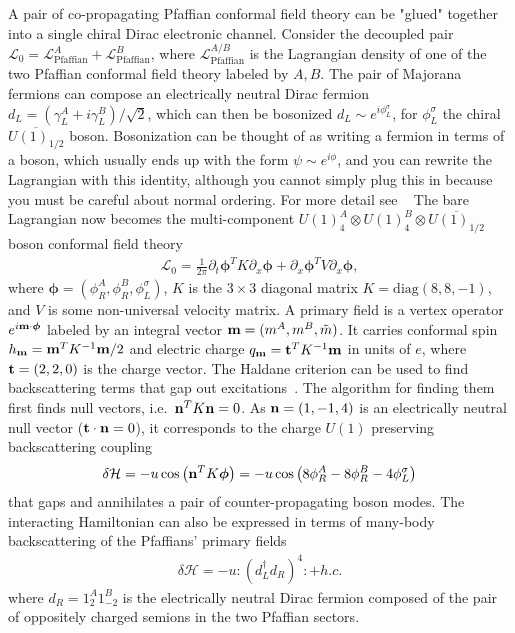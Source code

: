 A pair of co-propagating Pfaffian conformal field theory can be "glued" together into a single chiral Dirac electronic channel. Consider the decoupled pair $\mathcal{L}_0=\mathcal{L}_{\mathrm{Pfaffian}}^A+\mathcal{L}_{\mathrm{Pfaffian}}^B$, where $\mathcal{L}_{\mathrm{Pfaffian}}^{A/B}$ is the Lagrangian density of one of the two Pfaffian conformal field theory labeled by $A,B$. The pair of Majorana fermions can compose an electrically neutral Dirac fermion $d_L=(\gamma^A_L+i\gamma^B_L)/\sqrt{2}$, which can then be bosonized $d_L\sim e^{i\phi^\sigma_L}$, for $\phi^\sigma_L$ the chiral $\overline{U(1)_{1/2}}$ boson. Bosonization can be thought of as writing a fermion in terms of a boson, which usually ends up with the form $\psi\sim e^{i\phi}$, and you can rewrite the Lagrangian with this identity, although you cannot simply plug this in because you must be careful about normal ordering. For more detail see ~\cite{Senechal99} The bare Lagrangian now becomes the multi-component $U(1)_4^A\otimes U(1)_4^B\otimes\overline{U(1)_{1/2}}$ boson conformal field theory \begin{align}\mathcal{L}_0=\frac{1}{2\pi}\partial_t\boldsymbol{\phi}^TK\partial_x\boldsymbol{\phi}+\partial_x\boldsymbol{\phi}^TV\partial_x\boldsymbol{\phi},\label{881}\end{align} where $\boldsymbol{\phi}=(\phi_R^A,\phi_R^B,\phi^\sigma_L)$, $K$ is the $3\times3$ diagonal matrix $K=\mathrm{diag}(8,8,-1)$, and $V$ is some non-universal velocity matrix. A primary field is a vertex operator $e^{i{\bf m}\cdot\boldsymbol{\phi}}$ labeled by an integral vector ${\bf m}=(m^A,m^B,\tilde{m})$. It carries conformal spin $h_{\bf m}={\bf m}^TK^{-1}{\bf m}/2$ and electric charge $q_{\bf m}={\bf t}^TK^{-1}{\bf m}$ in units of $e$, where ${\bf t}=(2,2,0)$ is the charge vector. The Haldane criterion can be used to find backscattering terms that gap out excitations~\cite{Haldane95}. The algorithm for finding them first finds null vectors, i.e.~${\bf n}^TK{\bf n}=0$.  As ${\bf n}=(1,-1,4)$ is an electrically neutral null vector (${\bf t}\cdot{\bf n}=0$), it corresponds to the charge $U(1)$ preserving backscattering coupling \begin{align}\delta\mathcal{H}=-u\cos\left({\bf n}^TK\boldsymbol{\phi}\right)=-u\cos\left(8\phi^A_R-8\phi^B_R-4\phi^\sigma_L\right)\label{glueingH}\end{align} that gaps and annihilates a pair of counter-propagating boson modes. The interacting Hamiltonian can also be expressed in terms of many-body backscattering of the Pfaffians' primary fields \begin{align}\delta\mathcal{H}=-u:\left(d_L^\dagger d_R\right)^4:+h.c.\end{align} where $d_R=1_2^A1_{-2}^B$ is the electrically neutral Dirac fermion composed of the pair of oppositely charged semions in the two Pfaffian sectors.

